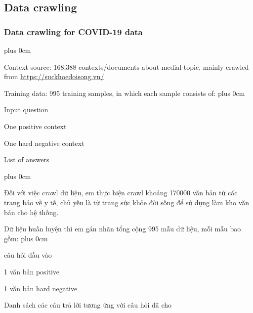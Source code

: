 \documentclass[11pt]{beamer}
\renewcommand{\raggedright}{\leftskip=0pt \rightskip=0pt plus 0cm}
\let\olditemize=\itemize
\renewenvironment{itemize}{\olditemize\raggedright}{\endlist}
\begin{document}
\subsection{Data crawling}
\begin{frame}
	\frametitle{Data crawling for COVID-19 data}
	\begin{itemize}
		\item Context source: 168,388 contexts/documents about medial topic,  mainly crawled from \url{https://suckhoedoisong.vn/}
		\item Training data: 995 training samples, in which each sample consists of:
		\begin{itemize}
			\item Input question
			\item One positive context
			\item One hard negative context
			\item List of answers
		\end{itemize}
	\end{itemize}
\end{frame}
\begin{frame}
\begin{itemize}
	\item Đối với việc crawl dữ liệu, em thực hiện crawl khoảng 170000 văn bản từ các trang báo về y tế, chủ yếu là từ trang sức khỏe đời sống để sử dụng làm kho văn bản cho hệ thống.
	\item Dữ liệu huấn luyện thì em gán nhãn tổng cộng 995 mẫu dữ liệu, mỗi mẫu bao gồm:
	\begin{itemize}
		\item câu hỏi đầu vào
		\item 1 văn bản positive
		\item 1 văn bản hard negative
		\item Danh sách các câu trả lời tương ứng với câu hỏi đã cho
	\end{itemize}
\end{itemize}
\end{frame}
\end{document}
